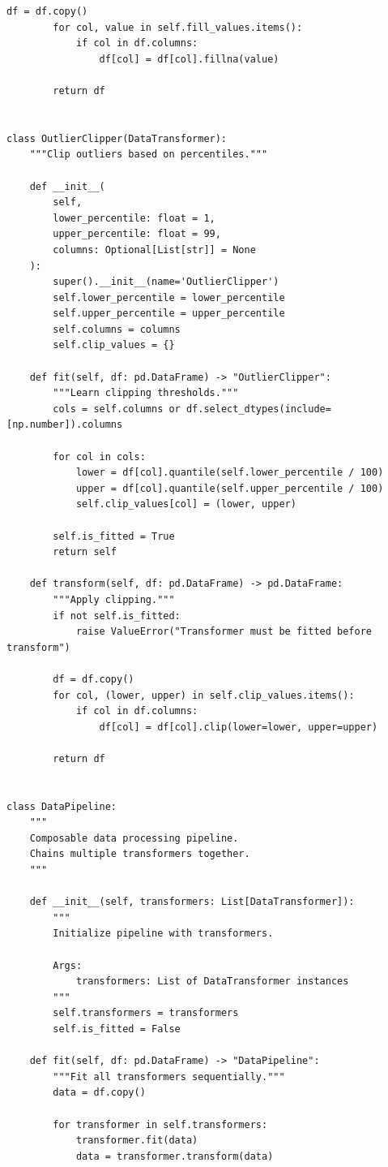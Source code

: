 \begin{lstlisting}[style=python, caption=Modular data processing pipeline]
        df = df.copy()
        for col, value in self.fill_values.items():
            if col in df.columns:
                df[col] = df[col].fillna(value)

        return df


class OutlierClipper(DataTransformer):
    """Clip outliers based on percentiles."""

    def __init__(
        self,
        lower_percentile: float = 1,
        upper_percentile: float = 99,
        columns: Optional[List[str]] = None
    ):
        super().__init__(name='OutlierClipper')
        self.lower_percentile = lower_percentile
        self.upper_percentile = upper_percentile
        self.columns = columns
        self.clip_values = {}

    def fit(self, df: pd.DataFrame) -> "OutlierClipper":
        """Learn clipping thresholds."""
        cols = self.columns or df.select_dtypes(include=[np.number]).columns

        for col in cols:
            lower = df[col].quantile(self.lower_percentile / 100)
            upper = df[col].quantile(self.upper_percentile / 100)
            self.clip_values[col] = (lower, upper)

        self.is_fitted = True
        return self

    def transform(self, df: pd.DataFrame) -> pd.DataFrame:
        """Apply clipping."""
        if not self.is_fitted:
            raise ValueError("Transformer must be fitted before transform")

        df = df.copy()
        for col, (lower, upper) in self.clip_values.items():
            if col in df.columns:
                df[col] = df[col].clip(lower=lower, upper=upper)

        return df


class DataPipeline:
    """
    Composable data processing pipeline.
    Chains multiple transformers together.
    """

    def __init__(self, transformers: List[DataTransformer]):
        """
        Initialize pipeline with transformers.

        Args:
            transformers: List of DataTransformer instances
        """
        self.transformers = transformers
        self.is_fitted = False

    def fit(self, df: pd.DataFrame) -> "DataPipeline":
        """Fit all transformers sequentially."""
        data = df.copy()

        for transformer in self.transformers:
            transformer.fit(data)
            data = transformer.transform(data)


\end{lstlisting}
